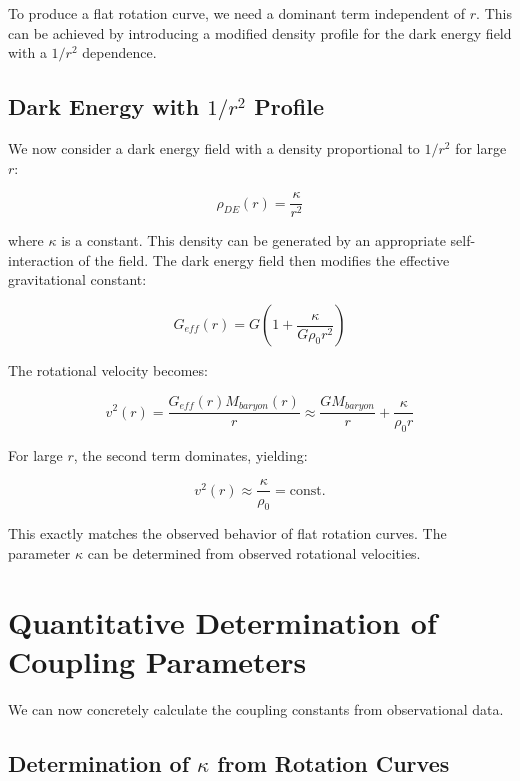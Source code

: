 \documentclass[a4paper,12pt]{article}
\begin{document}
	To produce a flat rotation curve, we need a dominant term independent of $r$. This can be achieved by introducing a modified density profile for the dark energy field with a $1/r^2$ dependence.
	
	\subsection{Dark Energy with $1/r^2$ Profile}
	
	We now consider a dark energy field with a density proportional to $1/r^2$ for large $r$:
	
	\begin{equation}
		\rho_{DE}(r) = \frac{\kappa}{r^2}
	\end{equation}
	
	where $\kappa$ is a constant. This density can be generated by an appropriate self-interaction of the field. The dark energy field then modifies the effective gravitational constant:
	
	\begin{equation}
		G_{eff}(r) = G\left(1 + \frac{\kappa}{G\rho_0 r^2}\right)
	\end{equation}
	
	The rotational velocity becomes:
	
	\begin{equation}
		v^2(r) = \frac{G_{eff}(r)M_{baryon}(r)}{r} \approx \frac{GM_{baryon}}{r} + \frac{\kappa}{\rho_0 r}
	\end{equation}
	
	For large $r$, the second term dominates, yielding:
	
	\begin{equation}
		v^2(r) \approx \frac{\kappa}{\rho_0} = \text{const.}
	\end{equation}
	
	This exactly matches the observed behavior of flat rotation curves. The parameter $\kappa$ can be determined from observed rotational velocities.
	
	\section{Quantitative Determination of Coupling Parameters}
	
	We can now concretely calculate the coupling constants from observational data.
	
	\subsection{Determination of $\kappa$ from Rotation Curves}
	
\end{document}
